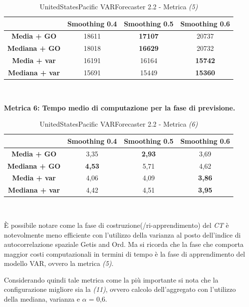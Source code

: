 \documentclass[12pt,a4paper,oneside,openright]{book}
\begin{document}
\begin{table}[H]
\centering
\begin{tabular}[H]{|c|c|c|c|}
\hline
& Smoothing 0.4 & Smoothing 0.5 & Smoothing 0.6\\
\hline
\textbf{Media + GO} & 18611 & \textbf{17107} & 20737\\ 
\hline
\textbf{Mediana + GO} & 18018 & \textbf{16629} & 20732\\ 
\hline
\textbf{Media + var} & 16191 & 16164 & \textbf{15742}\\ 
\hline
\textbf{Mediana + var} & 15691 & 15449 & \textbf{15360}\\ 
\hline
\end{tabular} \\
\caption{UnitedStatesPacific VARForecaster 2.2 - Metrica \textit{(5)}}
\end{table}

\medskip 
\textbf{Metrica 6: Tempo medio di computazione per la fase di previsione.}

\medskip

\begin{table}[H]
\centering
\begin{tabular}[H]{|c|c|c|c|}
\hline
& Smoothing 0.4 & Smoothing 0.5 & Smoothing 0.6\\
\hline
\textbf{Media + GO} & 3,35 & \textbf{2,93} & 3,69\\ 
\hline
\textbf{Mediana + GO} & \textbf{4,53} & 5,71 & 4,62\\ 
\hline
\textbf{Media + var} & 4,06 & 4,09 & \textbf{3,86}\\ 
\hline
\textbf{Mediana + var} & 4,42 & 4,51 & \textbf{3,95}\\ 
\hline
\end{tabular} \\
\caption{UnitedStatesPacific VARForecaster 2.2 - Metrica \textit{(6)}}
\end{table}

È possibile notare come la fase di costruzione(/ri-apprendimento) del \textit{CT} è notevolmente meno efficiente con l'utilizzo della varianza al posto dell'indice di autocorrelazione spaziale Getis and Ord. Ma si ricorda che la fase che comporta maggior costi computazionali in termini di tempo è la fase di apprendimento del modello VAR, ovvero la metrica \textit{(5)}.

Considerando quindi tale metrica come la più importante si nota che la configurazione migliore sia la \textit{(11)}, ovvero calcolo dell'aggregato con l'utilizzo della mediana, varianza e $\alpha$ = 0,6.
\end{document}

